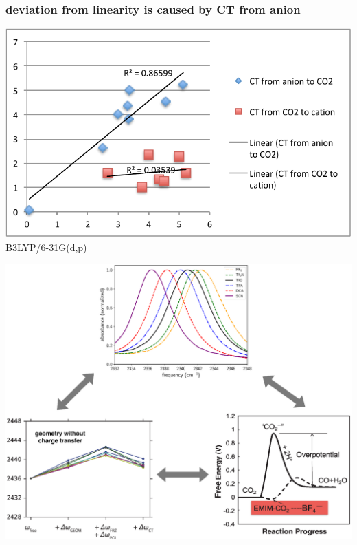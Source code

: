 \documentclass{beamer}
\begin{document}
\begin{frame}
  \frametitle{ deviation from linearity is caused by CT from anion}
  \centering
  \includegraphics[width=\linewidth,keepaspectratio]{./figures/angle_vs_ct_to_from.pdf}
  \scriptsize
  B3LYP/6-31G(d,p)
\end{frame}

\begin{frame}
  \includegraphics[width=0.90\linewidth,keepaspectratio]{./figures/application_of_ct.eps}
\end{frame}
\end{document}

